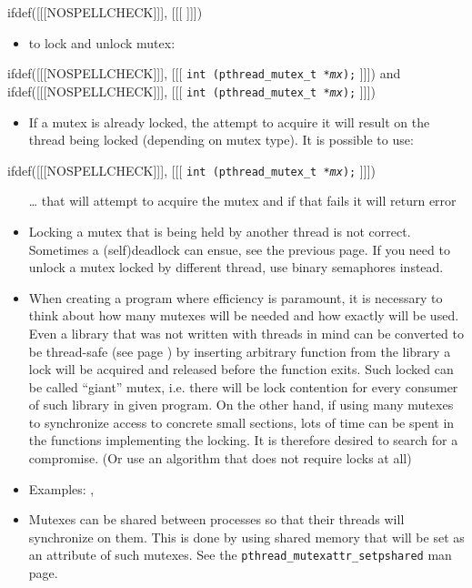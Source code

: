 
ifdef([[[NOSPELLCHECK]]], [[[
]]])

\begin{slide}

\begin{itemize}
\item to lock and unlock mutex:
\end{itemize}
ifdef([[[NOSPELLCHECK]]], [[[
\texttt{int (pthread\_mutex\_t *\emph{mx});}
]]])
and
ifdef([[[NOSPELLCHECK]]], [[[
\texttt{int (pthread\_mutex\_t *\emph{mx});}
]]])
\begin{itemize}
\item If a mutex is already locked, the attempt to acquire it will result on the
thread being locked (depending on mutex type).
It is possible to use:
\end{itemize}
ifdef([[[NOSPELLCHECK]]], [[[
\texttt{int (pthread\_mutex\_t *\emph{mx});}
]]])
\begin{itemize}
\item[\dots] that will attempt to acquire the mutex and if that fails it will
return error
\end{itemize}
\end{slide}

\label{MUTEXES2}

\begin{itemize}
\item Locking a mutex that is being held by another thread is not correct.
Sometimes a (self)deadlock can ensue, see the previous page. If you need to
unlock a mutex locked by different thread, use binary semaphores instead.
\item When creating a program where efficiency is paramount, it is necessary to
think about how many mutexes will be needed and how exactly will be used.
Even a library that was not written with threads in mind can be converted to be
thread-safe (see page \pageref{THREADSAFE}) by inserting arbitrary function from
the library a lock will be acquired and released before the function exits.
Such locked can be called ``giant'' mutex, i.e. there will be lock contention
for every consumer of such library in given program. On the other hand, if using
many mutexes to synchronize access to concrete small sections, lots of time can
be spent in the functions implementing the locking. It is therefore desired to
search for a compromise. (Or use an algorithm that does not require locks at
all)
\item \label{MUTEX_RACE} Examples: ,
\item Mutexes can be shared between processes so that their threads will
synchronize on them. This is done by using shared memory that will be set as an
attribute of such mutexes. See the
\texttt{pthread\_mutexattr\_setpshared} man page.
\end{itemize}


